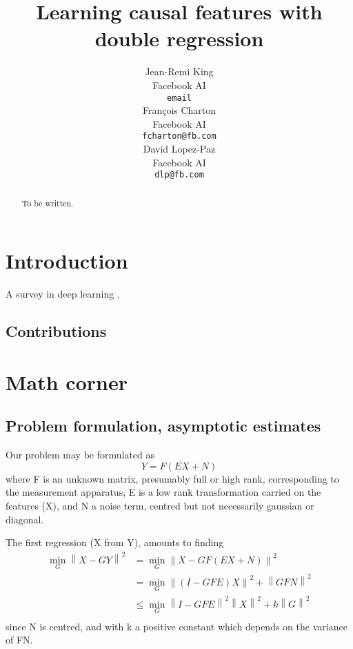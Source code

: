 \documentclass{article}
\title{Learning causal features with double regression}
\author{%
  Jean-Remi King\\
  Facebook AI\\
  \texttt{email} \\
  \And
  Fran\c{c}ois Charton\\
  Facebook AI\\
  \texttt{fcharton@fb.com}\\
  \And
  David Lopez-Paz\\
  Facebook AI\\
  \texttt{dlp@fb.com}
}
\begin{document}
\maketitle

\begin{abstract}
    To be written.
\end{abstract}

\section{Introduction}


A survey in deep learning \citep{deep_learning_nature}. 

\subsection{Contributions}

\section{Math corner}

\subsection{Problem formulation, asymptotic estimates}

Our problem may be formulated as
\begin{equation}
    Y = F(EX + N)
    \label{eq:model}
\end{equation}
where F is an unknown matrix, presumably full or high rank, corresponding to the measurement apparatus, E is a low rank transformation carried on the features (X), and N a noise term, centred but not necessarily gaussian or diagonal.

The first regression (X from Y), amounts to finding
\begin{equation}
\begin{aligned}
\min_G \left \| X-GY \right \|^2 &= \min_G \left \| X - GF(EX+N)\right\|^2 \\
&{}= \min_G \left \| (I-GFE)X\right\| ^2 + \left \| GFN\right \| ^2\\
&{}\leq \min_G \left \| I-GFE\right\| ^2 \left \| X\right\| ^2 + k\left \| G\right \| ^2\\ 
\end{aligned}
\end{equation}
since N is centred, and with k a positive constant which depends on the variance of FN.
\end{document}
